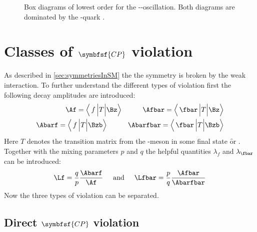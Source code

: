 \begin{figure}[tbp]
	\centering
	
	\hspace{0.5cm}
	
	\caption{Box diagrams of lowest order for the \Bz-\Bzb-oscillation. Both diagrams are dominated by the \tquark-quark \cite{Ellis:2016jkw}.}
	\label{fig:FeynmanMixing}
\end{figure}

\section[head={Types of \CP violation},tocentry={Classes of \CP violation}]{Classes of $\symbfsf{C{}P}$ violation}
\label{sec:CPVClasses}

As described in \cref{sec:symmetriesInSM} the the \CP symmetry is broken by the weak interaction. To further understand
the different types of \CP violation first the following decay amplitudes are introduced:
\begin{equation}
\begin{split}
\Af = \left<\,f\,\Big|T\Big|\Bz\right>\hspace{1cm}\Afbar = \left<\,\fbar\,\Big|T\Big|\Bz\right>\\
\Abarf = \left<\,f\,\Big|T\Big|\Bzb\right>\hspace{1cm}\Abarfbar = \left<\,\fbar\,\Big|T\Big|\Bzb\right>
\end{split}
\end{equation}
Here $T$ denotes the transition matrix from the \B-meson in some final state \f or \fbar. Together with the
mixing parameters $p$ and $q$ the helpful quantities $\lambda_f$ and $\lambda_{\fbar}$ can be introduced:
\begin{equation}
\Lf=\frac{q}{p}\frac{\Abarf}{\Af}\hspace{0.5cm}\text{and}
\hspace{0.5cm}\Lfbar=\frac{p}{q}\frac{\Afbar}{\Abarfbar}
\end{equation}
Now the three types of \CP violation can be separated.

\subsection[head={Direct \CP violation},tocentry={Direct \CP violation}]{Direct $\symbfsf{C{}P}$ violation}
\label{sec:DirectCPV}

